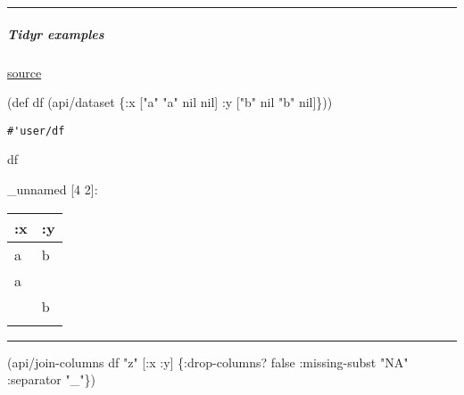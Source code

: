 \documentclass[]{article}
\newenvironment{Shaded}{\begin{snugshade}}{\end{snugshade}}
\newcommand{\AttributeTok}[1]{\textcolor[rgb]{0.77,0.63,0.00}{#1}}
\newcommand{\BuiltInTok}[1]{#1}
\newcommand{\FunctionTok}[1]{\textcolor[rgb]{0.00,0.00,0.00}{#1}}
\newcommand{\NormalTok}[1]{#1}
\newcommand{\StringTok}[1]{\textcolor[rgb]{0.31,0.60,0.02}{#1}}
\newcommand{\VariableTok}[1]{\textcolor[rgb]{0.00,0.00,0.00}{#1}}
\let\oldsubparagraph\subparagraph
\renewcommand{\subparagraph}[1]{\oldsubparagraph{#1}\mbox{}}
\begin{document}
\begin{center}\rule{0.5\linewidth}{0.5pt}\end{center}

\hypertarget{tidyr-examples}{%
\subparagraph{Tidyr examples}\label{tidyr-examples}}

\href{https://tidyr.tidyverse.org/reference/unite.html}{source}

\begin{Shaded}
\begin{Highlighting}[]
\NormalTok{(}\BuiltInTok{def}\FunctionTok{ df }\NormalTok{(api/dataset \{}\AttributeTok{:x}\NormalTok{ [}\StringTok{"a"} \StringTok{"a"} \VariableTok{nil} \VariableTok{nil}\NormalTok{]}
                      \AttributeTok{:y}\NormalTok{ [}\StringTok{"b"} \VariableTok{nil} \StringTok{"b"} \VariableTok{nil}\NormalTok{]\}))}
\end{Highlighting}
\end{Shaded}

\begin{verbatim}
#'user/df
\end{verbatim}

\begin{Shaded}
\begin{Highlighting}[]
\NormalTok{df}
\end{Highlighting}
\end{Shaded}

\_unnamed {[}4 2{]}:

\begin{longtable}[]{@{}ll@{}}
\toprule
:x & :y\tabularnewline
\midrule
\endhead
a & b\tabularnewline
a &\tabularnewline
& b\tabularnewline
&\tabularnewline
\bottomrule
\end{longtable}

\begin{center}\rule{0.5\linewidth}{0.5pt}\end{center}

\begin{Shaded}
\begin{Highlighting}[]
\NormalTok{(api/join-columns df }\StringTok{"z"}\NormalTok{ [}\AttributeTok{:x} \AttributeTok{:y}\NormalTok{] \{}\AttributeTok{:drop-columns}\NormalTok{? }\VariableTok{false}
                                  \AttributeTok{:missing-subst} \StringTok{"NA"}
                                  \AttributeTok{:separator} \StringTok{"_"}\NormalTok{\})}
\end{Highlighting}
\end{Shaded}
\end{document}
